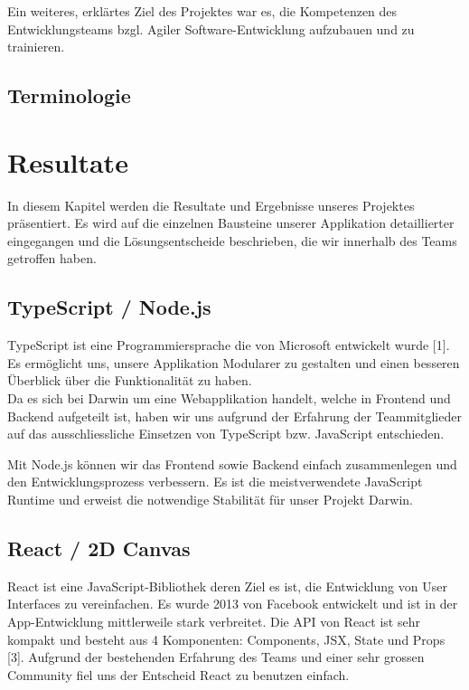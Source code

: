 \documentclass[11pt,a4paper,titlepage]{article}
\begin{document}
Ein weiteres, erklärtes Ziel des Projektes war es, die Kompetenzen des Entwicklungsteams bzgl. Agiler Software-Entwicklung aufzubauen und zu trainieren.

\subsection{Terminologie}


\section{Resultate}
In diesem Kapitel werden die Resultate und Ergebnisse unseres Projektes präsentiert.
Es wird auf die einzelnen Bausteine unserer Applikation detaillierter eingegangen und die Lösungsentscheide beschrieben, die wir innerhalb des Teams getroffen haben.

\subsection{TypeScript / Node.js}
TypeScript ist eine Programmiersprache die von Microsoft entwickelt wurde [1]. Es ermöglicht uns, unsere Applikation Modularer zu gestalten und einen besseren Überblick über die Funktionalität zu haben.\\
Da es sich bei Darwin um eine Webapplikation handelt, welche in Frontend und Backend aufgeteilt ist, haben wir uns aufgrund der Erfahrung der Teammitglieder auf das ausschliessliche Einsetzen von TypeScript bzw. JavaScript entschieden.

Mit Node.js können wir das Frontend sowie Backend einfach zusammenlegen und den Entwicklungsprozess verbessern. Es ist die meistverwendete JavaScript Runtime und erweist die notwendige Stabilität für unser Projekt Darwin.

\subsection{React / 2D Canvas}
React ist eine JavaScript-Bibliothek deren Ziel es ist, die Entwicklung von User Interfaces zu vereinfachen. Es wurde 2013 von Facebook entwickelt und ist in der App-Entwicklung mittlerweile stark verbreitet.
Die API von React ist sehr kompakt und besteht aus 4 Komponenten: Components, JSX, State und Props [3].
Aufgrund der bestehenden Erfahrung des Teams und einer sehr grossen Community fiel uns der Entscheid React zu benutzen einfach.
\end{document}

